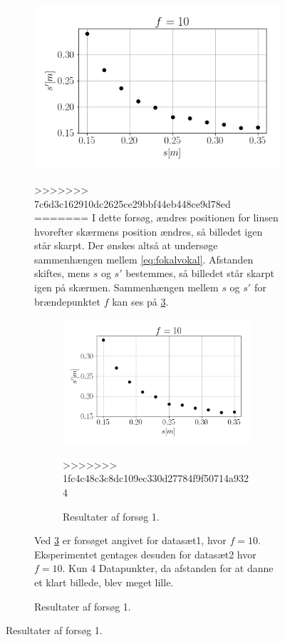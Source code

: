 \begin{table}[H]
\begin{figure}[H]
\begin{figure}[H]
    \includegraphics[width=\linewidth]{res1.png}
    \caption{Resultater af forsøg 1}
>>>>>>> 7c6d3c162910dc2625ce29bbf44eb448ce9d78ed
=======
I dette forsøg, ændres positionen for linsen hvorefter skærmens position ændres, så billedet igen står skarpt. Der ønskes altså at undersøge sammenhængen mellem \cref{eq:fokalvokal}. Afstanden skiftes, mens $s$ og $s'$ bestemmes, så billedet står skarpt igen på skærmen.
Sammenhængen mellem $s$ og $s'$ for brændepunktet $f$ kan ses på \cref{fig:res1}.
\begin{figure}[H]
    \includegraphics[width=\linewidth]{res1.png}
    \caption{Resultater af forsøg 1.}
>>>>>>> 1fc4c48c3c8dc109ec330d27784f9f50714a9324
    \label{fig:res1}
\end{figure}
Ved \cref{fig:res1} er forsøget angivet for datasæt1, hvor $f = 10$. Eksperimentet gentages desuden for datasæt2 hvor $f = 10$. Kun 4 Datapunkter, da afstanden for at danne et klart billede, blev meget lille.

\end{figure}
\end{figure}
\end{table}
